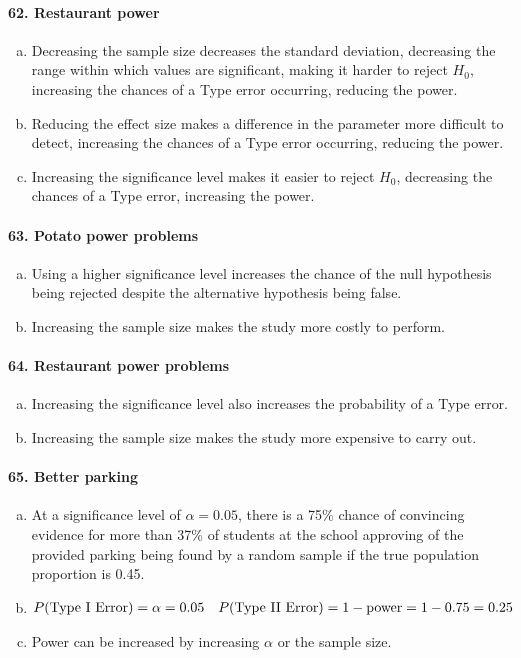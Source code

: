 \documentclass[12pt, A4]{article}
\renewcommand{\Roman}[1]{\MakeUppercase{\romannumeral #1}}
\begin{document}
			\paragraph{62. Restaurant power}
				\begin{enumerate}[a.]
					\item
						Decreasing the sample size decreases the standard deviation, decreasing the range within which values are significant, making it harder to reject $H_0$, increasing the chances of a Type \Roman{2} error occurring, reducing the power.
					\item
						Reducing the effect size makes a difference in the parameter more difficult to detect, increasing the chances of a Type \Roman{2} error occurring, reducing the power.
					\item
						Increasing the significance level makes it easier to reject $H_0$, decreasing the chances of a Type \Roman{2} error, increasing the power.
				\end{enumerate}
			\paragraph{63. Potato power problems}
				\begin{enumerate}[a.]
					\item
						Using a higher significance level increases the chance of the null hypothesis being rejected despite the alternative hypothesis being false.
					\item 
						Increasing the sample size makes the study more costly to perform.
				\end{enumerate}
			\paragraph{64. Restaurant power problems}
				\begin{enumerate}[a.]
					\item
						Increasing the significance level also increases the probability of a Type \Roman{1} error.
					\item
						Increasing the sample size makes the study more expensive to carry out.
				\end{enumerate}
			\paragraph{65. Better parking}
				\begin{enumerate}[a.]
					\item At a significance level of $\alpha = 0.05$, there is a 75\% chance of convincing evidence for more than 37\% of students at the school approving of the provided parking being found by a random sample if the true population proportion is 0.45.
					\item
						\begin{align*}
							P(\text{Type \Roman{1} Error}) &= \alpha = 0.05 & P(\text{Type \Roman{2} Error}) = 1 - \mathrm{power} = 1 - 0.75 = 0.25
						\end{align*}
					\item Power can be increased by increasing $\alpha$ or the sample size.
				\end{enumerate}
\end{document}
